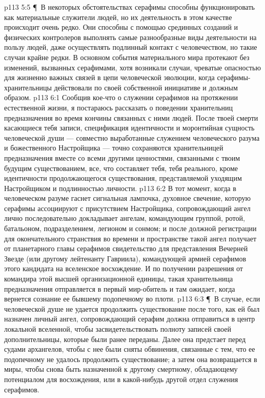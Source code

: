 \vs p113 5:5 \P\ В некоторых обстоятельствах серафимы способны функционировать как материальные служители людей, но их деятельность в этом качестве происходит очень редко. Они способны с помощью срединных созданий и физических контролеров выполнять самые разнообразные виды деятельности на пользу людей, даже осуществлять подлинный контакт с человечеством, но такие случаи крайне редки. В основном события материального мира протекают без изменений, вызванных серафимами, хотя возникали случаи, чреватые опасностью для жизненно важных связей в цепи человеческой эволюции, когда серафимы\hyp{}хранительницы действовали по своей собственной инициативе и должным образом.
\vs p113 6:1 Сообщив кое\hyp{}что о служении серафимов на протяжении естественной жизни, я постараюсь рассказать о поведении хранительниц предназначения во время кончины связанных с ними людей. После твоей смерти касающиеся тебя записи, спецификация идентичности и моронтийная сущность человеческой души --- совместно выработанные служением человеческого разума и божественного Настройщика --- точно сохраняются хранительницей предназначения вместе со всеми другими ценностями, связанными с твоим будущим существованием, все, что составляет тебя, тебя реального, кроме идентичности продолжающегося существования, представляемой уходящим Настройщиком и подлинностью личности.
\vs p113 6:2 В тот момент, когда в человеческом разуме гаснет сигнальная лампочка, духовное свечение, которую серафимы ассоциируют с присутствием Настройщика, сопровождающий ангел лично последовательно докладывает ангелам, командующим группой, ротой, батальоном, подразделением, легионом и сонмом; и после должной регистрации для окончательного странствия во времени и пространстве такой ангел получает от планетарного главы серафимов свидетельство для представления Вечерней Звезде (или другому лейтенанту Гавриила), командующей армией серафимов этого кандидата на вселенское восхождение. И по получении разрешения от командира этой высшей организационной единицы, такая хранительница предназначения отправляется в первый мир\hyp{}обитель и там ожидает, когда вернется сознание ее бывшему подопечному во плоти.
\vs p113 6:3 \P\ В случае, если человеческой душе не удается продолжить существование после того, как ей был назначен личный ангел, сопровождающий серафим должна отправиться в центр локальной вселенной, чтобы засвидетельствовать полноту записей своей дополнительницы, которые были ранее переданы. Далее она предстает перед судами архангелов, чтобы с нее были сняты обвинения, связанные с тем, что ее подопечному не удалось продолжить существование; а затем она возвращается в миры, чтобы снова быть назначенной к другому смертному, обладающему потенциалом для восхождения, или в какой\hyp{}нибудь другой отдел служения серафимов.
